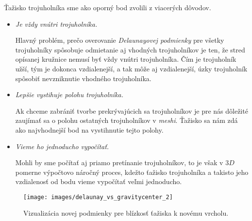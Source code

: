 \begin{enumerate}
{         Ťažisko trojuholníka sme ako oporný bod zvolili z viacerých dôvodov.
         \begin{itemize}
            \item{
                \textit{Je vždy vnútri trojuholníka.}

                Hlavný problém, prečo overovanie \textit{Delaunayovej podmienky} pre všetky trojuholníky spôsobuje
                odmietanie aj vhodných trojuholníkov je ten, že stred opísanej kružnice nemusí byť vždy
                vnútri trojuholníka. Čím je trojuholník užší, tým je dokonca vzdialenejší, a tak môže aj
                vzdialenejší, úzky trojuholník spôsobiť nevzniknutie vhodného trojuholníka. 
            }
            \item{
                \textit{Lepšie vystihuje polohu trojuholníka.}

                Ak chceme zabrániť tvorbe prekrývajúcich sa trojuholníkov je pre nás dôležité zaujímať sa 
                o polohu ostatných trojuholníkov v \textit{meshi}. Ťažisko sa nám zdá ako najvhodnejší bod na 
                vystihnutie tejto polohy.
            }
            \item{
                \textit{Vieme ho jednoducho vypočítať.}

                Mohli by sme počítať aj priamo pretínanie trojuholníkov, to je však v $3D$ pomerne 
                výpočtovo náročný proces, kdežto ťažisko trojuholníka a takisto jeho vzdialenosť od 
                bodu vieme vypočítať veľmi jednoducho.
            }
         \end{itemize}
         
         \begin{figure}
         \centerline{\texttt{[image: images/delaunay\_vs\_gravitycenter\_2]}}
         \caption[Nová podmienka pre blízkosť ťažiska k novému vrcholu]
         {Vizualizácia novej podmienky pre blízkosť ťažiska k novému vrcholu.}
         \label{obr:delaunay_vs_gravitycenter_2}
         \end{figure}
         
}
\end{enumerate}
